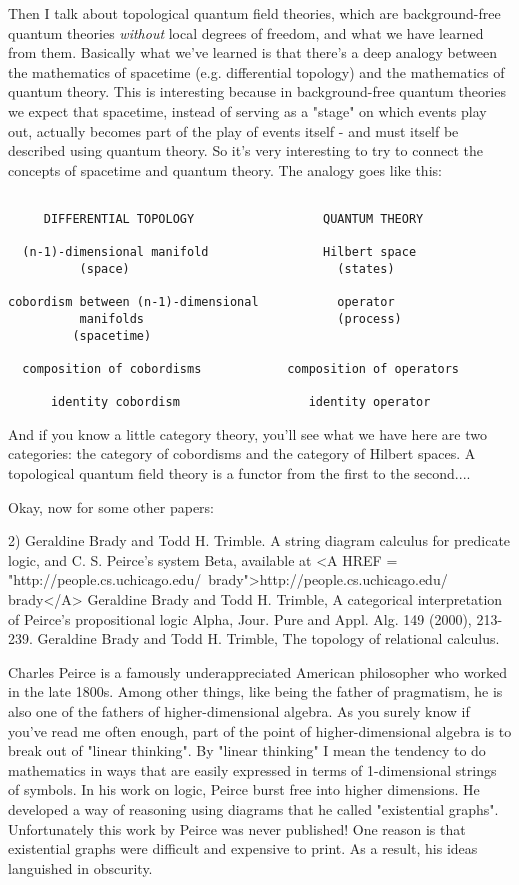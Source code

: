 Then I talk about topological quantum field theories, which are
background-free quantum theories \emph{without} local degrees of freedom, and
what we have learned from them.  Basically what we've learned is that
there's a deep analogy between the mathematics of spacetime
(e.g. differential topology) and the mathematics of quantum theory.
This is interesting because in background-free quantum theories we
expect that spacetime, instead of serving as a "stage" on which events
play out, actually becomes part of the play of events itself - and
must itself be described using quantum theory.  So it's very interesting
to try to connect the concepts of spacetime and quantum theory.  The 
analogy goes like this:
\begin{verbatim}

     DIFFERENTIAL TOPOLOGY                  QUANTUM THEORY            

  (n-1)-dimensional manifold                Hilbert space             
          (space)                             (states)                  

cobordism between (n-1)-dimensional           operator    
          manifolds                           (process)                 
         (spacetime)                         

  composition of cobordisms            composition of operators  

      identity cobordism                  identity operator         

\end{verbatim}
    
And if you know a little category theory, you'll see what we have
here are two categories: the category of cobordisms and the category
of Hilbert spaces.  A topological quantum field theory is a functor
from the first to the second....

Okay, now for some other papers:

2) Geraldine Brady and Todd H. Trimble. A string diagram calculus for
predicate logic, and C. S. Peirce's system Beta, available at
<A HREF = "http://people.cs.uchicago.edu/~brady">http://people.cs.uchicago.edu/~
brady</A>
Geraldine Brady and Todd H. Trimble, A categorical interpretation
of Peirce's propositional logic Alpha, Jour. Pure and
Appl. Alg. 149 (2000), 213-239.
Geraldine Brady and Todd H. Trimble, The topology of relational
calculus.



Charles Peirce is a famously underappreciated American philosopher who
worked in the late 1800s.  Among other things, like being the father of
pragmatism, he is also one of the fathers of higher-dimensional algebra.
As you surely know if you've read me often enough, part of the point of
higher-dimensional algebra is to break out of "linear thinking".  By
"linear thinking" I mean the tendency to do mathematics in ways that are
easily expressed in terms of 1-dimensional strings of symbols.  In his
work on logic, Peirce burst free into higher dimensions.  He developed a
way of reasoning using diagrams that he called "existential graphs".  
Unfortunately this work by Peirce was never published!  One reason is 
that existential graphs were difficult and expensive to print.  As a
result, his ideas languished in obscurity.

